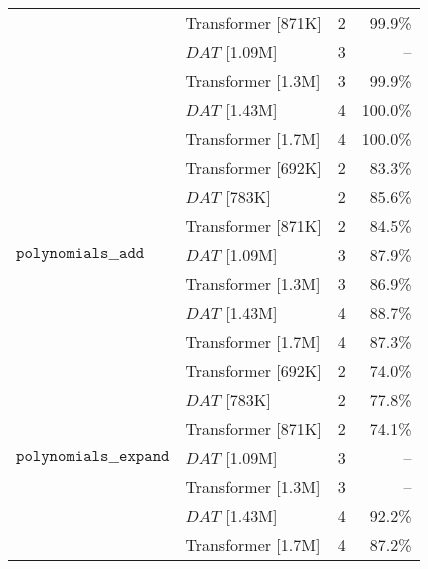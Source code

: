 \begin{tabular}{l|l|c|r}
                                                              & Transformer [871K]   & 2         & 99.9\%   \\
                                                              & $DAT$ [1.09M]        & 3         & --       \\
                                                              & Transformer [1.3M]   & 3         & 99.9\%   \\
                                                              & $DAT$ [1.43M]        & 4         & 100.0\%  \\
                                                              & Transformer [1.7M]   & 4         & 100.0\%  \\
    \cline{1-4}
    \multirow{7}{*}{$\texttt{polynomials\_\_add}$}            & Transformer [692K]   & 2         & 83.3\%   \\
                                                              & $DAT$ [783K]         & 2         & 85.6\%   \\
                                                              & Transformer [871K]   & 2         & 84.5\%   \\
                                                              & $DAT$ [1.09M]        & 3         & 87.9\%   \\
                                                              & Transformer [1.3M]   & 3         & 86.9\%   \\
                                                              & $DAT$ [1.43M]        & 4         & 88.7\%   \\
                                                              & Transformer [1.7M]   & 4         & 87.3\%   \\
    \cline{1-4}
    \multirow{7}{*}{$\texttt{polynomials\_\_expand}$}         & Transformer [692K]   & 2         & 74.0\%   \\
                                                              & $DAT$ [783K]         & 2         & 77.8\%   \\
                                                              & Transformer [871K]   & 2         & 74.1\%   \\
                                                              & $DAT$ [1.09M]        & 3         & --       \\
                                                              & Transformer [1.3M]   & 3         & --       \\
                                                              & $DAT$ [1.43M]        & 4         & 92.2\%   \\
                                                              & Transformer [1.7M]   & 4         & 87.2\%   \\
    \bottomrule
\end{tabular}